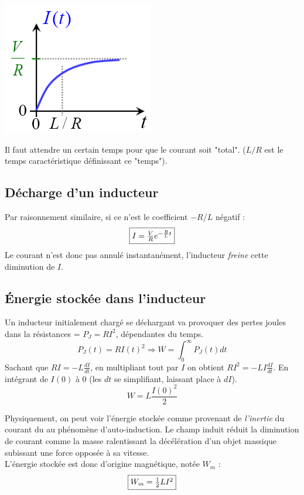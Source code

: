 \documentclass	[11pt, a4paper, openany]{book}
\begin{document}
\begin{center}
	\includegraphics[scale=0.50]{em/image23.png}\\
\end{center}
Il faut attendre un certain temps pour que le courant soit "total". ($L/R$ est le temps caractéristique  définissant ce "temps").

\subsection{Décharge d'un inducteur}
Par raisonnement similaire, si ce n'est le coefficient $-R/L$ négatif : 
\begin{equation}
	\fbox{$ I = \frac{V}{R}e^{-\frac{R}{L}t}$}
\end{equation}
Le courant n'est donc pas annulé instantanément, l'inducteur \textit{freine} cette diminution de $I$.

\subsection{Énergie stockée dans l'inducteur}
Un inducteur initialement chargé se déchargant va provoquer des pertes joules dans la résistances = $P_J = RI^2$, dépendantes du temps.
\begin{equation}
	P_J(t) = RI(t)^2 \Rightarrow W = \int_0^\infty P_J(t) dt
\end{equation}
Sachant que $RI = -L\frac{dI}{dt}$, en multipliant tout par $I$ on obtient $RI^2 = -LI\frac{dI}{dt}$. En intégrant de $I(0)$ à $0$ (les $dt$ se simplifiant, laissant place à $dI$).
\begin{equation}
	W = L\frac{I(0)^2}{2}
\end{equation}

Physiquement, on peut voir l'énergie stockée comme provenant de \textit{l'inertie} du courant du au phénomène d'auto-induction. Le champ induit réduit la diminution de courant comme la masse ralentissant la décélération d'un objet massique subissant une force opposée à sa vitesse.\\
L'énergie stockée est donc d'origine magnétique, notée $W_m$ :
\begin{equation}
	\fbox{$W_m = \frac{1}{2}LI^2 $}
\end{equation}
\end{document}
